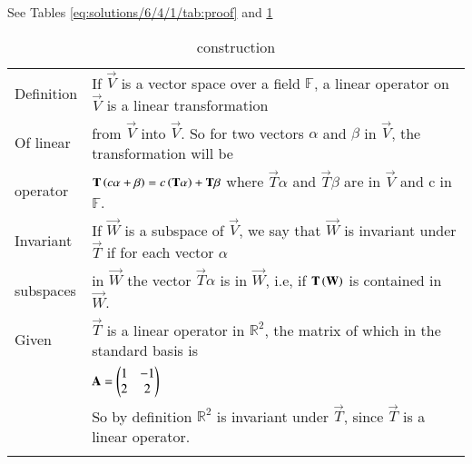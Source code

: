 See Tables     \ref{eq:solutions/6/4/1/tab:proof} and     \ref{eq:solutions/6/4/1/tab:construction}

%
\onecolumn
\begin{longtable}{|l|l|}
    \hline
        Definition & If $\vec{V}$ is a vector space over a field $\mathbb{F}$, a linear operator on $\vec{V}$ is a linear transformation \\
        Of linear &from $\vec{V}$ into $\vec{V}$. So for two vectors $\alpha$ and $\beta$ in $\vec{V}$, the transformation will be \\
        operator& $\mathbf{T}\left(c\alpha+\beta\right)=c\left(\mathbf{T}\alpha\right)+\mathbf{T}\beta$ where $\vec{T}\alpha$ and $\vec{T}\beta$ are in $\vec{V}$ and c in $\mathbb{F}$.\\
    \hline
    Invariant &If $\vec{W}$ is a subspace of $\vec{V}$, we say that $\vec{W}$ is invariant under $\vec{T}$ if for each vector $\alpha$\\
    subspaces &in $\vec{W}$ the vector $\vec{T}\alpha$ is in $\vec{W}$, i.e, if $\mathbf{T}\left(\mathbf{W}\right)$ is contained in $\vec{W}$.\\
    \hline
    Given & $\vec{T}$ is a linear operator in $\mathbb{R}^2$, the matrix of which in the standard basis is\\
    & \qquad  \qquad \qquad \qquad \qquad$\mathbf{A}=\begin{pmatrix}1&-1\\2&2\end{pmatrix}$\\
    & So by definition $\mathbb{R}^2$ is invariant under $\vec{T}$, since $\vec{T}$ is a linear operator.\\
    \hline
    \caption{construction}
    \label{eq:solutions/6/4/1/tab:construction}
\end{longtable}
